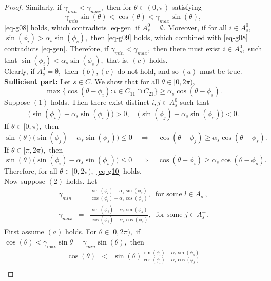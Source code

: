 \documentclass{amsart}
\theoremstyle{definition}
\theoremstyle{remark}
\numberwithin{equation}{section}
\begin{document}
\begin{proof}
		Similarly, if  $\gamma_{min}<\gamma_{max},$ then for  $\theta \in (0,\pi)$ satisfying 
		\[\gamma_{min}\sin(\theta)<\cos(\theta)<\gamma_{max}\sin(\theta),\] 
		\eqref{eq-g08} holds, which contradicts \eqref{eq-gen} if $A_s^0=\emptyset.$ Moreover,  if for all $i\in A_s^0,$ $\sin(\phi_i)>\alpha_s\sin(\phi_s),$ then \eqref{eq-g09} holds, which combined with \eqref{eq-g08} contradicts \eqref{eq-gen}. Therefore, if $\gamma_{min}<\gamma_{max},$ then there must exist $i\in A_s^0,$ such that  $\sin(\phi_i)<\alpha_s\sin(\phi_s),$ that is, $(c)$ holds.\\
		
		Clearly, if $A_s^0=\emptyset,$ then $(b), (c)$ do not hold, and so $(a)$ must be true.\\
		
		\textbf{Sufficient part:} Let $s\in C.$ We show that for all $\theta\in [0,2\pi),$
		\begin{equation}\label{eq-g10}
			\max\Big\{\cos(\theta-\phi_i):i\in C_{11}\cap C_{21}\Big\}\geq \alpha_s\cos(\theta-\phi_s).
		\end{equation}
		Suppose $(1)$ holds. Then there exist distinct $i,j\in A_s^0$ such that 
		\[\Big(\sin(\phi_i)-\alpha_s\sin(\phi_s)\Big)>0, \quad \Big(\sin(\phi_j)-\alpha_s\sin(\phi_s)\Big)<0.\]
		If $\theta\in [0,\pi),$ then 
		\[\sin(\theta)\Big(\sin(\phi_j)-\alpha_s\sin(\phi_s)\Big)\leq 0\quad \Rightarrow \quad  \cos(\theta-\phi_j)\geq \alpha_s\cos(\theta-\phi_s).\]
		If $\theta\in [\pi,2\pi),$ then 
		\[\sin(\theta)\Big(\sin(\phi_i)-\alpha_s\sin(\phi_s)\Big)\leq 0\quad \Rightarrow \quad  \cos(\theta-\phi_i)\geq \alpha_s\cos(\theta-\phi_s).\]
		Therefore, for all $\theta\in [0,2\pi),$ \eqref{eq-g10} holds.\\
		Now suppose $(2)$ holds. Let 
		\begin{eqnarray*}
			\gamma_{min}&=&\frac{\sin(\phi_l)-\alpha_s \sin(\phi_s)}{\cos(\phi_l)-\alpha_s \cos(\phi_s)},~\text{ for some } l\in A_s^-,	\\
			\gamma_{max}&=&\frac{\sin(\phi_j)-\alpha_s\sin(\phi_s)}{\cos(\phi_j)-\alpha_s \cos(\phi_s)},~\text{ for some }j\in A_s^+.
		\end{eqnarray*}
		First assume $(a)$ holds. %
		For $\theta\in [0,2\pi),$ if $\cos(\theta)<\gamma_{\max}\sin\theta=\gamma_{min}\sin(\theta),$ then 
		\begin{eqnarray*}
			\cos(\theta) &<& \sin(\theta)\frac{\sin(\phi_l)-\alpha_s \sin(\phi_s)}{\cos(\phi_l)-\alpha_s \cos(\phi_s)}\\

\end{eqnarray*}
\end{proof}
\end{document}
